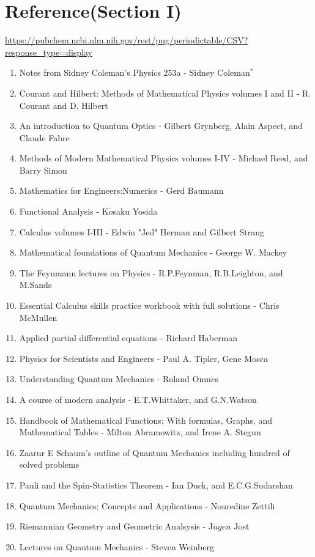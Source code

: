 \documentclass[a4paper, 10pt, onepage]{elegantbook}
\begin{document}
{\chapter{Reference(Section I)}

\url{https://pubchem.ncbi.nlm.nih.gov/rest/pug/periodictable/CSV?response_type=display} 

\begin{enumerate}
\item Notes from Sidney Coleman's Physics 253a - Sidney Coleman$^*$
\item Courant and Hilbert: Methods of Mathematical Physics volumes I and II - R. Courant and D. Hilbert
\item An introduction to Quantum Optics - Gilbert Grynberg, Alain Aspect, and Claude Fabre
\item Methods of Modern Mathematical Physics volumes I-IV - Michael Reed, and Barry Simon
\item Mathematics for Engineers:Numerics - Gerd Baumann
\item Functional Analysis - K$\dot{o}$saku Yosida
\item Calculus volumes I-III - Edwin "Jed" Herman and Gilbert Strang
\item Mathematical foundations of Quantum Mechanics - George W. Mackey
\item The Feynmann lectures on Physics - R.P.Feynman, R.B.Leighton, and M.Sands
\item Essential Calculus skills practice workbook with full solutions - Chris McMullen
\item Applied partial differential equations - Richard Haberman
\item Physics for Scientists and Engineers - Paul A. Tipler, Gene Mosca
\item Understanding Quantum Mechanics - Roland Omn$\acute{e}$s
\item A course of modern analysis - E.T.Whittaker, and G.N.Watson
\item Handbook of Mathematical Functions; With formulas, Graphs, and Mathematical Tables - Milton Abramowitz, and Irene 
A. Stegun
\item Zaarur E Schaum's outline of Quantum Mechanics including hundred of solved problems
\item Pauli and the Spin-Statistics Theorem - Ian Duck, and E.C.G.Sudarshan
\item Quantum Mechanics; Concepts and Applications - Nouredine Zettili
\item Riemannian Geometry and Geometric Analsysis - J$\ddot{u}gen$ Jost
\item Lectures on Quantum Mechanics - Steven Weinberg
\end{enumerate}

}
\end{document}
